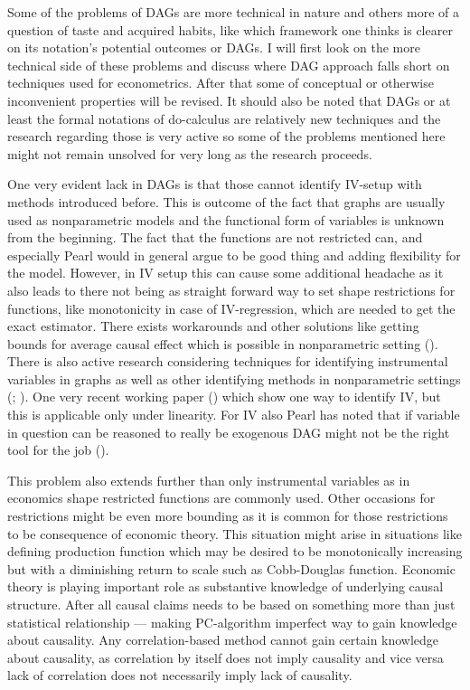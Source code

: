 \documentclass[main=english,12pt,a4paper,pdftex,econ,utf8]{aaltothesis}
\begin{document}
Some of the problems of DAGs are more technical in nature and others more of a question of taste and acquired habits, like which framework one thinks is clearer on its notation's potential outcomes or DAGs. I will first look on the more technical side of these problems and discuss where DAG approach falls short on techniques used for econometrics. After that some of conceptual or otherwise inconvenient properties will be revised. It should also be noted that DAGs or at least the formal notations of do-calculus are relatively new techniques and the research regarding those is very active so some of the problems mentioned here might not remain unsolved for very long as the research proceeds.

One very evident lack in DAGs is that those cannot identify IV-setup with methods introduced before. This is outcome of the fact that graphs are usually used as nonparametric models and the functional form of variables is unknown from the beginning. The fact that the functions are not restricted can, and especially Pearl would in general argue to be good thing and adding flexibility for the model. However, in IV setup this can cause some additional headache as it also leads to there not being as straight forward way to set shape restrictions for functions, like monotonicity in case of IV-regression, which are needed to get the exact estimator. There exists workarounds and other solutions like getting bounds for average causal effect which is possible in nonparametric setting (\cite{Balke1997}). There is also active research considering techniques for identifying instrumental variables in graphs as well as other identifying methods in nonparametric settings (\cite{Freyberger2017}; \cite{Freyberger2015}). One very recent working paper (\cite{Hoveid2021}) which show one way to identify IV, but this is applicable only under linearity. For IV also Pearl has noted that if variable in question can be reasoned to really be exogenous DAG might not be the right tool for the job (\cite{PearlMackenzie18}).

This problem also extends further than only instrumental variables as in economics shape restricted functions are commonly used. Other occasions for restrictions might be even more bounding as it is common for those restrictions to be consequence of economic theory. This situation might arise in situations like defining production function which may be desired to be monotonically increasing but with a diminishing return to scale such as Cobb-Douglas function. Economic theory is playing important role as substantive knowledge of underlying causal structure. After all causal claims needs to be based on something more than just statistical relationship --- making PC-algorithm imperfect way to gain knowledge about causality. Any correlation-based method cannot gain certain knowledge about causality, as correlation by itself does not imply causality and vice versa lack of correlation does not necessarily imply lack of causality.
\end{document}
